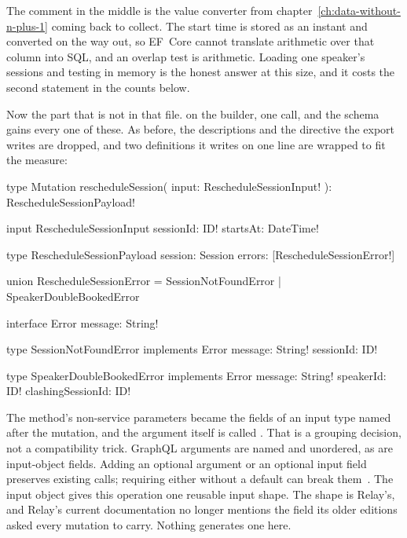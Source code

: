 %
The comment in the middle is the value converter from
chapter~\ref{ch:data-without-n-plus-1} coming back to collect. The start time
is stored as an instant and converted on the way out, so EF~Core cannot
translate arithmetic over that column into SQL, and an overlap test is
arithmetic. Loading one speaker's sessions and testing in memory is the honest
answer at this size, and it costs the second statement in the counts below.

%
Now the part that is not in that file.  on the
builder, one call, and the schema gains every one of these. As before, the
descriptions and the  directive the export writes are dropped,
and two definitions it writes on one line are wrapped to fit the measure:

\begin{graphqlsdl}
type Mutation {
  rescheduleSession(
    input: RescheduleSessionInput!
  ): RescheduleSessionPayload!
}

input RescheduleSessionInput {
  sessionId: ID!
  startsAt: DateTime!
}

type RescheduleSessionPayload {
  session: Session
  errors: [RescheduleSessionError!]
}

union RescheduleSessionError =
  SessionNotFoundError | SpeakerDoubleBookedError

interface Error {
  message: String!
}

type SessionNotFoundError implements Error {
  message: String!
  sessionId: ID!
}

type SpeakerDoubleBookedError implements Error {
  message: String!
  speakerId: ID!
  clashingSessionId: ID!
}
\end{graphqlsdl}

%
The method's non-service parameters became the fields of an input type named
after the mutation, and the argument itself is called . That is
a grouping decision, not a compatibility trick. GraphQL arguments are named
and unordered, as are input-object fields. Adding an optional argument or an
optional input field preserves existing calls; requiring either without a
default can break them~\autocite{graphqlspec2025}. The input object gives
this operation one reusable input shape. The shape is Relay's, and Relay's current
documentation no longer mentions the  field its older
editions asked every mutation to carry. Nothing generates one here.

